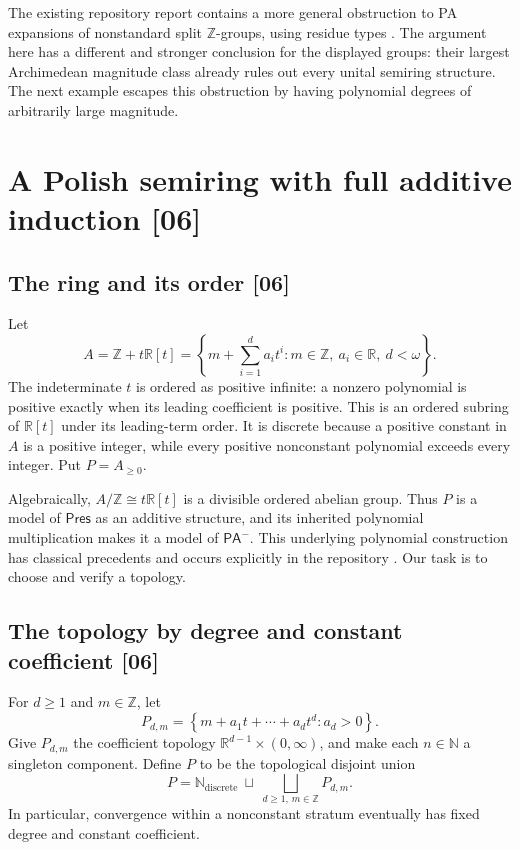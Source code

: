 \documentclass[11pt]{article}
\numberwithin{equation}{section}
\theoremstyle{definition}
\theoremstyle{remark}
\newcommand{\N}{\mathbb N}
\newcommand{\Z}{\mathbb Z}
\newcommand{\R}{\mathbb R}
\newcommand{\src}[1]{\textup{\textsf{\small[#1]}}}
\newcommand{\Pres}{\mathsf{Pres}}
\newcommand{\PAminus}{\mathsf{PA}^{-}}
\begin{document}
The existing repository report contains a more general obstruction to
PA expansions of nonstandard split $\Z$-groups, using residue types
\cite{s06:RepoGroups}. The argument here has a different and stronger
conclusion for the displayed groups: their largest Archimedean
magnitude class already rules out every unital semiring structure.
The next example escapes this obstruction by having polynomial degrees
of arbitrarily large magnitude.

\section{A Polish semiring with full additive induction \src{06}}
\label{pma:cp:sec:polynomial}

\subsection{The ring and its order \src{06}}

Let
\[
 A=\Z+t\R[t]
 =\left\{m+\sum_{i=1}^d a_i t^i:
                     m\in\Z,\ a_i\in\R,\ d<\omega\right\}.
\]
The indeterminate $t$ is ordered as positive infinite: a nonzero
polynomial is positive exactly when its leading coefficient is positive.
This is an ordered subring of $\R[t]$ under its leading-term order.
It is discrete because a positive constant in $A$ is a positive integer,
while every positive nonconstant polynomial exceeds every integer.
Put $P=A_{\geq0}$.

Algebraically, $A/\Z\cong t\R[t]$ is a divisible ordered abelian
group. Thus $P$ is a model of $\Pres$ as an additive structure, and its
inherited polynomial multiplication makes it a model of $\PAminus$.
This underlying polynomial construction has classical precedents and
occurs explicitly in the repository \cite{CookPitassi,s06:RepoPolynomial}.
Our task is to choose and verify a topology.

\subsection{The topology by degree and constant coefficient \src{06}}

For $d\geq1$ and $m\in\Z$, let
\[
 P_{d,m}=\left\{m+a_1t+\cdots+a_dt^d:a_d>0\right\}.
\]
Give $P_{d,m}$ the coefficient topology
$\R^{d-1}\times(0,\infty)$, and make each $n\in\N$ a singleton
component. Define $P$ to be the topological disjoint union
\begin{equation}
 P=\N_{\mathrm{discrete}}\ \sqcup\
          \bigsqcup_{d\geq1,\,m\in\Z}P_{d,m}.
 \label{pma:cp:eq:poly-topology}
\end{equation}
In particular, convergence within a nonconstant stratum eventually has
fixed degree and constant coefficient.
\end{document}
